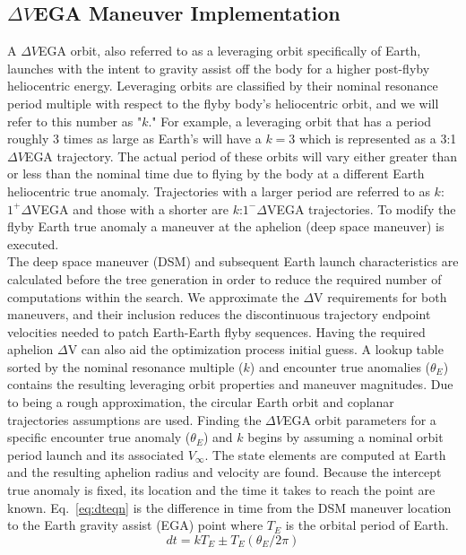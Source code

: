 \documentclass[letterpaper, paper,11pt]{./AAS}		%
\begin{document}
\subsection{$\Delta V$EGA Maneuver Implementation}
A $\Delta V$EGA orbit, also referred to as a leveraging orbit specifically of Earth, launches with the intent to gravity assist off the body for a higher post-flyby heliocentric energy\cite{Hollenbeck}.  Leveraging orbits are classified by their nominal resonance period multiple with respect to the flyby body's heliocentric orbit, and we will refer to this number as "$k$." For example, a leveraging orbit that has a period roughly 3 times as large as Earth's will have a $k=3$ which is represented as a 3:1 $\Delta V$EGA trajectory. The actual period of these orbits will vary either greater than or less than the nominal time due to flying by the body at a different Earth heliocentric true anomaly. Trajectories with a larger period are referred to as $k$:$1^{+} \Delta$VEGA and those with a shorter are $k$:$1^{-} \Delta$VEGA trajectories. To modify the flyby Earth true anomaly a maneuver at the aphelion (deep space maneuver) is executed.
\\\indent The deep space maneuver (DSM) and subsequent Earth launch characteristics are calculated before the tree generation in order to reduce the required number of computations within the search. We approximate the $\Delta$V requirements for both maneuvers, and their inclusion reduces the discontinuous trajectory endpoint velocities needed to patch Earth-Earth flyby sequences. Having the required aphelion $\Delta$V can also aid the optimization process initial guess. A lookup table sorted by the nominal resonance multiple ($k$) and encounter true anomalies ($\theta_{E}$) contains the resulting leveraging orbit properties and maneuver magnitudes. Due to being a rough approximation, the circular Earth orbit and coplanar trajectories assumptions are used. Finding the $\Delta V$EGA orbit parameters for a specific encounter true anomaly ($\theta_{E}$) and $k$ begins by assuming a nominal orbit period launch and its associated $V_\infty$. The state elements are computed at Earth and the resulting aphelion radius and velocity are found. Because the intercept true anomaly is fixed, its location and the time it takes to reach the point are known. Eq.~\eqref{eq:dteqn} is the difference in time from the DSM maneuver location to the Earth gravity assist (EGA) point where $T_E$ is the orbital period of Earth.
%
\begin{equation}
	\label{eq:dteqn}
	dt = kT_E \pm T_E(\theta_E/2\pi)
\end{equation}
\end{document}
